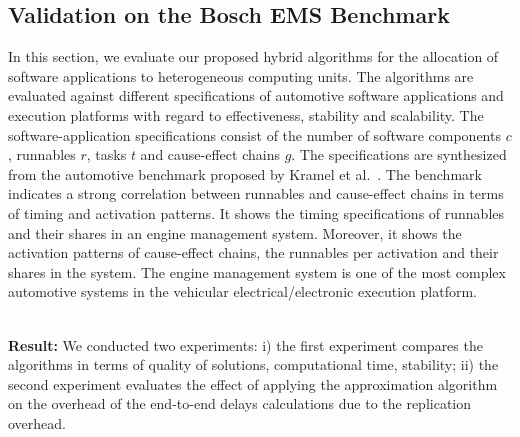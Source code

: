 \subsection*{Validation on the Bosch EMS Benchmark} 
In this section, we evaluate our proposed hybrid \pso{} algorithms for the allocation of software applications to heterogeneous computing units. The algorithms are evaluated against different specifications of automotive software applications and execution platforms with regard to effectiveness, stability and scalability. The software-application specifications consist of the number of software components $c$, runnables $r$, tasks $t$ and cause-effect chains $g$.  The specifications are synthesized from the automotive benchmark proposed by Kramel et al.~\cite{Kramer2015RealFree}. The benchmark indicates a strong correlation between runnables and cause-effect chains in terms of timing and activation patterns. It shows the timing specifications of runnables and their shares in an engine management system. Moreover, it shows the activation patterns of cause-effect chains, the runnables per activation and their shares in the system. The engine management system is one of the most complex automotive systems in the vehicular electrical/electronic execution platform. 

\noindent\\ \textbf{Result:} We conducted two experiments: i) the first experiment compares the algorithms in terms of quality of solutions, computational time, stability; ii) the second experiment evaluates the effect of applying the approximation algorithm on the overhead of the end-to-end delays calculations due to the replication overhead.

